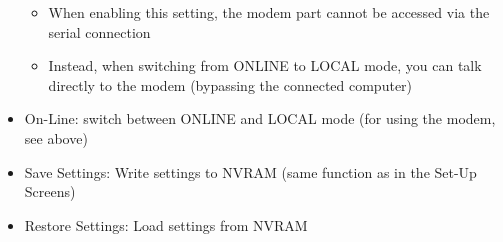 \begin{itemize}[leftmargin=1em]
\begin{itemize}[noitemsep]
  \item When enabling this setting, the modem part cannot be accessed via the serial connection
  \item Instead, when switching from ONLINE to LOCAL mode, you can talk directly to the modem (bypassing the connected computer)
 \end{itemize}
 \item On-Line: switch between ONLINE and LOCAL mode (for using the modem, see above)
 \item Save Settings: Write settings to NVRAM (same function as in the Set-Up Screens)
 \item Restore Settings: Load settings from NVRAM
\end{itemize}

